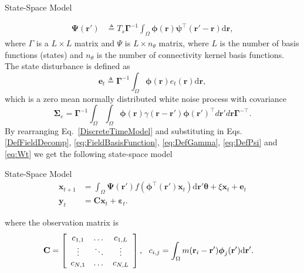 \documentclass[final]{beamer}
\newlength{\onecolwid}
\begin{document}
\begin{frame}[t]
\begin{columns}[t]
\begin{column}{\onecolwid}
\begin{block}{State-Space Model}
{\begin{align}
		\boldsymbol{\Psi}(\mathbf{r}') &\triangleq T_s\boldsymbol{\Gamma}^{-1}\int_\Omega {\boldsymbol{\phi}(\mathbf{r})\boldsymbol{\psi}^{\top}\label{eq:DefPsi} (\mathbf{r}'-\mathbf{r})\textrm{d}\mathbf{r}},
	\end{align}
	where $\Gamma$ is a $L\times L$ matrix and $\Psi$ is $L \times n_{\theta}$ matrix, where $L$ is the number of basis functions (states) and $n_{\theta}$ is the number of connectivity kernel basis functions. The state disturbance is defined as
	\begin{equation}\label{eq:Wt} 
		\mathbf{e}_t \triangleq \boldsymbol{\Gamma}^{-1}\int_\Omega {\boldsymbol{\phi} ( \mathbf{r} )e_t( \mathbf{r} )\textrm{d}\mathbf{r}},
	\end{equation}
	which is a zero mean normally distributed white noise process with covariance
	\begin{equation}
		\boldsymbol\Sigma_e =\mathbf{\Gamma}^{-1}\int_{\Omega}\int_{\Omega}\boldsymbol{\phi}\left(\mathbf r\right) \gamma\left(\mathbf r- \mathbf r' \right)\boldsymbol{\phi}\left(\mathbf r'\right)^{\top}d\mathbf r' d\mathbf r\mathbf{\Gamma}^{- \top}. 
	\end{equation}
	By rearranging Eq.~\ref{DiscreteTimeModel} and substituting in Eqs. \ref{DefFieldDecomp}, \ref{eq:FieldBasisFunction}, \ref{eq:DefGamma}, \ref{eq:DefPsi} and \ref{eq:Wt} we get the following state-space model
	\begin{alertblock}{State-Space Model}
	\begin{align}
		\mathbf{x}_{t+1} &= \int_\Omega \boldsymbol{\Psi}(\mathbf{r}') f(\boldsymbol{\phi}^{\top}(\mathbf{r}')\mathbf{x}_t) \textrm{d}\mathbf{r}' \boldsymbol{\theta} + \xi\mathbf{x}_t + \mathbf{e}_t \\
		\mathbf{y}_t &= \mathbf{C}\mathbf{x}_t + \boldsymbol{\varepsilon}_t.
		\end{align} 	
	\end{alertblock}
	where the observation matrix is 
	\begin{align}
		\mathbf{C} &= \left[
		\begin{array}{{ccc}} 
			c_{1,1} & \dots & c_{1,L} \\
			\vdots & \ddots & \vdots \\
			c_{N,1} & \dots & c_{N,L} 
		\end{array}
		\right], \ \	c_{i,j} = \int_{\Omega}m(\mathbf{r}_i - \mathbf{r}')\boldsymbol{\phi}_j(\mathbf{r}')\textrm{d}\mathbf{r}'. 
		\end{align}
	}
\end{block}


\end{column}
\end{columns}
\end{frame}
\end{document}
